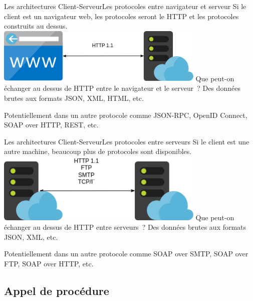 \documentclass{beamer}
\begin{document}
    \begin{frame}{Les architectures Client-Serveur}{Les protocoles entre navigateur et serveur}
        Si le client est un navigateur web, les protocoles seront le HTTP et les protocoles construits au dessus.
        \bigbreak
        \centering
        \includegraphics[width=10cm]{image/browser-soa-protocols.drawio}
        \flushleft
        Que peut-on échanger au dessus de HTTP entre le navigateur et le serveur~?
        \pause
        \bigbreak
        Des données brutes aux formats JSON, XML, HTML, etc.

        Potentiellement dans un autre protocole comme JSON-RPC, OpenID Connect, SOAP over HTTP, REST, etc.
    \end{frame}

    \begin{frame}{Les architectures Client-Serveur}{Les protocoles entre serveurs}
        Si le client est une autre machine, beaucoup plus de protocoles sont disponibles.
        \bigbreak
        \centering
        \includegraphics[width=10cm]{image/m2m-soa-protocols.drawio}
        \flushleft
        Que peut-on échanger au dessus de HTTP entre serveurs~?
        \pause
        \bigbreak
        Des données brutes aux formats JSON, XML, etc.

        Potentiellement dans un autre protocole comme SOAP over SMTP, SOAP over FTP, SOAP over HTTP, etc.
    \end{frame}

    \subsection{Appel de procédure}\label{subsec:rpc}
\end{document}
